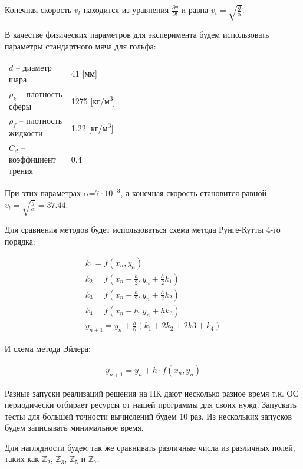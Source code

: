 \documentclass[master, och, diploma, times]{sty/SCWorks}
\theoremstyle{plain}
\theoremstyle{definition}
\begin{document}
Конечная скорость $v_t$ находится из уравнения $\frac{\partial v}{ \partial t}$ и равна $v_t=\sqrt{\frac{g}{\alpha}}$.

В качестве физических параметров для эксперимента будем использовать параметры стандартного мяча для гольфа:

\begin{threeparttable}
\begin{longtable}[H]{lp{0.7\linewidth}}
{$d$} -- диаметр шара & 41 [мм] \\
{$\rho_k$} -- плотность сферы & 1275 [кг/м\textsuperscript{3}] \\
{$\rho_f$} -- плотность жидкости & 1.22 [кг/м\textsuperscript{3}] \\
{$C_d$} -- коэффициент трения & 0.4 
\end{longtable} 
\end{threeparttable}


При этих параметрах $\alpha$=$7 \cdot 10^{-3}$, а конечная скорость становится равной $v_t=\sqrt{\frac{g}{\alpha}}=37.44$.


Для сравнения методов будет использоваться схема метода Рунге-Кутты 4-го порядка:

\begin{equation}%
\begin{aligned}
k_1 = f(x_n, y_n) \\
k_2 = f(x_n+\frac{h}{2}, y_n+\frac{h}{2}k_1) \\
k_3 = f(x_n+\frac{h}{2}, y_n+\frac{h}{2}k_2) \\ 
k_4 = f(x_n+h, y_n+hk_3) \\
y_{n+1}=y_n+\frac{h}{6}(k_1+2k_2+2k3+k_4)
\end{aligned}
\end{equation}


\noindent И схема метода Эйлера:

\begin{equation}%
\begin{aligned}
y_{n+1}=y_n+h \cdot f(x_n, y_n)
\end{aligned}
\end{equation}

Разные запуски реализаций решения на ПК дают несколько разное время т.к. ОС периодически отбирает ресурсы от нашей программы для своих нужд. Запускать тесты для большей точности вычислений будем $10$ раз. Из нескольких запусков будем записывать минимальное время.

Для наглядности будем так же сравнивать различные числа из различных полей, таких как $\mathbb{Z}_2$, $\mathbb{Z}_3$, $\mathbb{Z}_5$ и $\mathbb{Z}_7$.
\end{document}
